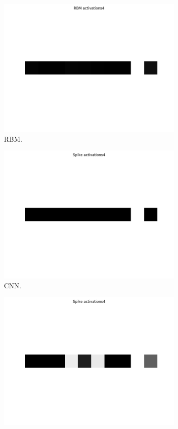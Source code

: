 \begin{figure}
	\begin{subfigure}[t]{.24\textwidth}
  		\centering
  		\includegraphics[width=.9\linewidth]{imgs/convert/rbm00004.png}
  		\caption{RBM.}
  		\label{fig:sub1}
	\end{subfigure}%
	\begin{subfigure}[t]{.24\textwidth}
  		\centering
  		\includegraphics[width=.9\linewidth]{imgs/convert/cnn00004.png}
  		\caption{CNN.}
  		\label{fig:sub2}
	\end{subfigure}
	\begin{subfigure}[t]{.24\textwidth}
  		\centering
  		\includegraphics[width=.9\linewidth]{imgs/convert/coba00004.png}

\end{subfigure}
\end{figure}
